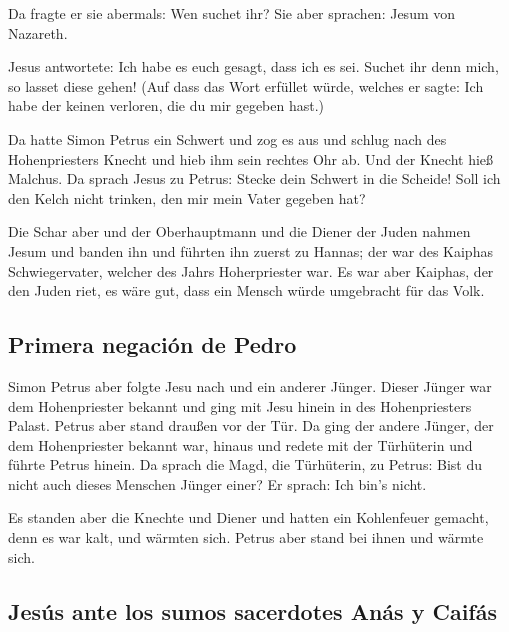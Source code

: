 Da fragte er sie abermals: Wen suchet ihr? Sie aber
sprachen: Jesum von Nazareth.

 Jesus antwortete: Ich habe es euch gesagt, dass ich es
sei. Suchet ihr denn mich, so lasset diese gehen!  (Auf
dass das Wort erfüllet würde, welches er sagte: Ich habe der keinen
verloren, die du mir gegeben hast.)

 Da hatte Simon Petrus ein Schwert und zog es aus und
schlug nach des Hohenpriesters Knecht und hieb ihm sein rechtes Ohr ab.
Und der Knecht hieß Malchus.  Da sprach Jesus zu Petrus:
Stecke dein Schwert in die Scheide! Soll ich den Kelch nicht trinken,
den mir mein Vater gegeben hat?

 Die Schar aber und der Oberhauptmann und die Diener der
Juden nahmen Jesum und banden ihn  und führten ihn zuerst
zu Hannas; der war des Kaiphas Schwiegervater, welcher des Jahrs
Hoherpriester war.  Es war aber Kaiphas, der den Juden
riet, es wäre gut, dass ein Mensch würde umgebracht für das Volk.

\hypertarget{primera-negaciuxf3n-de-pedro}{%
\subsection{Primera negación de
Pedro}\label{primera-negaciuxf3n-de-pedro}}

 Simon Petrus aber folgte Jesu nach und ein anderer
Jünger. Dieser Jünger war dem Hohenpriester bekannt und ging mit Jesu
hinein in des Hohenpriesters Palast.  Petrus aber stand
draußen vor der Tür. Da ging der andere Jünger, der dem Hohenpriester
bekannt war, hinaus und redete mit der Türhüterin und führte Petrus
hinein.  Da sprach die Magd, die Türhüterin, zu Petrus:
Bist du nicht auch dieses Menschen Jünger einer? Er sprach: Ich bin's
nicht.

 Es standen aber die Knechte und Diener und hatten ein
Kohlenfeuer gemacht, denn es war kalt, und wärmten sich. Petrus aber
stand bei ihnen und wärmte sich.

\hypertarget{jesuxfas-ante-los-sumos-sacerdotes-anuxe1s-y-caifuxe1s}{%
\subsection{Jesús ante los sumos sacerdotes Anás y
Caifás}\label{jesuxfas-ante-los-sumos-sacerdotes-anuxe1s-y-caifuxe1s}}

